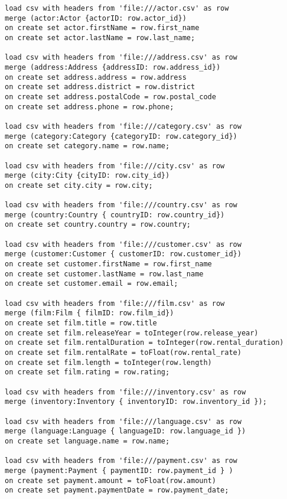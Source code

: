 \footnotesize
\begin{verbatim}
load csv with headers from 'file:///actor.csv' as row 
merge (actor:Actor {actorID: row.actor_id})
on create set actor.firstName = row.first_name 
on create set actor.lastName = row.last_name;

load csv with headers from 'file:///address.csv' as row
merge (address:Address {addressID: row.address_id})
on create set address.address = row.address
on create set address.district = row.district
on create set address.postalCode = row.postal_code
on create set address.phone = row.phone;

load csv with headers from 'file:///category.csv' as row
merge (category:Category {categoryID: row.category_id})
on create set category.name = row.name;

load csv with headers from 'file:///city.csv' as row
merge (city:City {cityID: row.city_id})
on create set city.city = row.city;

load csv with headers from 'file:///country.csv' as row
merge (country:Country { countryID: row.country_id})
on create set country.country = row.country;

load csv with headers from 'file:///customer.csv' as row
merge (customer:Customer { customerID: row.customer_id})
on create set customer.firstName = row.first_name
on create set customer.lastName = row.last_name
on create set customer.email = row.email;

load csv with headers from 'file:///film.csv' as row
merge (film:Film { filmID: row.film_id})
on create set film.title = row.title
on create set film.releaseYear = toInteger(row.release_year)
on create set film.rentalDuration = toInteger(row.rental_duration)
on create set film.rentalRate = toFloat(row.rental_rate)
on create set film.length = toInteger(row.length)
on create set film.rating = row.rating;

load csv with headers from 'file:///inventory.csv' as row
merge (inventory:Inventory { inventoryID: row.inventory_id });

load csv with headers from 'file:///language.csv' as row
merge (language:Language { languageID: row.language_id })
on create set language.name = row.name;

load csv with headers from 'file:///payment.csv' as row
merge (payment:Payment { paymentID: row.payment_id } )
on create set payment.amount = toFloat(row.amount)
on create set payment.paymentDate = row.payment_date;


\end{verbatim}
